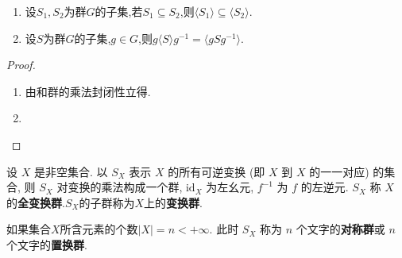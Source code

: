 \documentclass[../../main.tex]{subfiles}%
\begin{document}
\begin{proposition}\label{proposition:群的生成组的基本性质111}
\begin{enumerate}[(1)]
\item 设$S_1,S_2$为群$G$的子集,若$S_1\subseteq S_2$,则$\langle S_1 \rangle\subseteq \langle S_2 \rangle$.

\item 设$S$为群$G$的子集,$g\in G$,则$g\langle S\rangle g^{-1}=\langle gSg^{-1}\rangle .$
\end{enumerate}
\end{proposition}
\begin{proof}
\begin{enumerate}[(1)]
\item 由和群的乘法封闭性立得.

\item 
\end{enumerate}

\end{proof}

\begin{definition}
设 \( X \) 是非空集合. 以 \( S_X \) 表示 \( X \) 的所有可逆变换 (即 \( X \) 到 \( X \) 的一一对应) 的集合, 则 \( S_X \) 对变换的乘法构成一个群, \( \text{id}_X \) 为左幺元, \( f^{-1} \) 为 \( f \) 的左逆元. \( S_X \) 称 \( X \) 的\textbf{全变换群}.$S_X$的子群称为$X$上的\textbf{变换群}.

如果集合$X$所含元素的个数\( |X| = n < +\infty \). 此时 \( S_X \) 称为 \( n \) 个文字的\textbf{对称群}或 \( n \) 个文字的\textbf{置换群}.
\end{definition}
\end{document}
